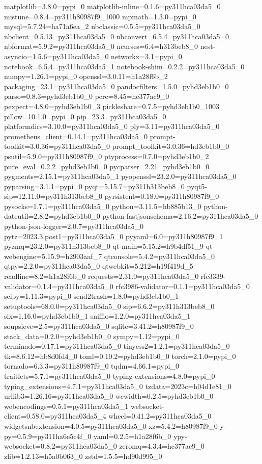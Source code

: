 matplotlib=3.8.0=pypi_0
matplotlib-inline=0.1.6=py311hca03da5_0
mistune=0.8.4=py311h80987f9_1000
mpmath=1.3.0=pypi_0
mysql=5.7.24=ha71a6ea_2
nbclassic=0.5.5=py311hca03da5_0
nbclient=0.5.13=py311hca03da5_0
nbconvert=6.5.4=py311hca03da5_0
nbformat=5.9.2=py311hca03da5_0
ncurses=6.4=h313beb8_0
nest-asyncio=1.5.6=py311hca03da5_0
networkx=3.1=pypi_0
notebook=6.5.4=py311hca03da5_1
notebook-shim=0.2.2=py311hca03da5_0
numpy=1.26.1=pypi_0
openssl=3.0.11=h1a28f6b_2
packaging=23.1=py311hca03da5_0
pandocfilters=1.5.0=pyhd3eb1b0_0
parso=0.8.3=pyhd3eb1b0_0
pcre=8.45=hc377ac9_0
pexpect=4.8.0=pyhd3eb1b0_3
pickleshare=0.7.5=pyhd3eb1b0_1003
pillow=10.1.0=pypi_0
pip=23.3=py311hca03da5_0
platformdirs=3.10.0=py311hca03da5_0
ply=3.11=py311hca03da5_0
prometheus_client=0.14.1=py311hca03da5_0
prompt-toolkit=3.0.36=py311hca03da5_0
prompt_toolkit=3.0.36=hd3eb1b0_0
psutil=5.9.0=py311h80987f9_0
ptyprocess=0.7.0=pyhd3eb1b0_2
pure_eval=0.2.2=pyhd3eb1b0_0
pycparser=2.21=pyhd3eb1b0_0
pygments=2.15.1=py311hca03da5_1
pyopenssl=23.2.0=py311hca03da5_0
pyparsing=3.1.1=pypi_0
pyqt=5.15.7=py311h313beb8_0
pyqt5-sip=12.11.0=py311h313beb8_0
pyrsistent=0.18.0=py311h80987f9_0
pysocks=1.7.1=py311hca03da5_0
python=3.11.5=hb885b13_0
python-dateutil=2.8.2=pyhd3eb1b0_0
python-fastjsonschema=2.16.2=py311hca03da5_0
python-json-logger=2.0.7=py311hca03da5_0
pytz=2023.3.post1=py311hca03da5_0
pyyaml=6.0=py311h80987f9_1
pyzmq=23.2.0=py311h313beb8_0
qt-main=5.15.2=h9b4df51_9
qt-webengine=5.15.9=h2903aaf_7
qtconsole=5.4.2=py311hca03da5_0
qtpy=2.2.0=py311hca03da5_0
qtwebkit=5.212=h19f419d_5
readline=8.2=h1a28f6b_0
requests=2.31.0=py311hca03da5_0
rfc3339-validator=0.1.4=py311hca03da5_0
rfc3986-validator=0.1.1=py311hca03da5_0
scipy=1.11.3=pypi_0
send2trash=1.8.0=pyhd3eb1b0_1
setuptools=68.0.0=py311hca03da5_0
sip=6.6.2=py311h313beb8_0
six=1.16.0=pyhd3eb1b0_1
sniffio=1.2.0=py311hca03da5_1
soupsieve=2.5=py311hca03da5_0
sqlite=3.41.2=h80987f9_0
stack_data=0.2.0=pyhd3eb1b0_0
sympy=1.12=pypi_0
terminado=0.17.1=py311hca03da5_0
tinycss2=1.2.1=py311hca03da5_0
tk=8.6.12=hb8d0fd4_0
toml=0.10.2=pyhd3eb1b0_0
torch=2.1.0=pypi_0
tornado=6.3.3=py311h80987f9_0
tqdm=4.66.1=pypi_0
traitlets=5.7.1=py311hca03da5_0
typing-extensions=4.8.0=pypi_0
typing_extensions=4.7.1=py311hca03da5_0
tzdata=2023c=h04d1e81_0
urllib3=1.26.16=py311hca03da5_0
wcwidth=0.2.5=pyhd3eb1b0_0
webencodings=0.5.1=py311hca03da5_1
websocket-client=0.58.0=py311hca03da5_4
wheel=0.41.2=py311hca03da5_0
widgetsnbextension=4.0.5=py311hca03da5_0
xz=5.4.2=h80987f9_0
y-py=0.5.9=py311ha6e5c4f_0
yaml=0.2.5=h1a28f6b_0
ypy-websocket=0.8.2=py311hca03da5_0
zeromq=4.3.4=hc377ac9_0
zlib=1.2.13=h5a0b063_0
zstd=1.5.5=hd90d995_0
